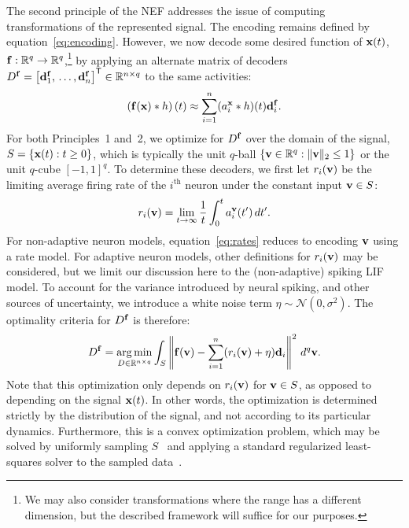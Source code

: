 The second principle of the NEF addresses the issue of computing transformations of the represented signal.
The encoding remains defined by equation~\ref{eq:encoding}.
However, we now decode some desired function of $\mathbf{x}(t)$, $\mathbf{f} : \mathbb{R}^q \rightarrow \mathbb{R}^q$,\footnote{
We may also consider transformations where the range has a different dimension, but the described framework will suffice for our purposes.}
by applying an alternate matrix of decoders $D^{\mathbf{f}} = {\left[ \mathbf{d}^{\mathbf{f}}_1\text{,}\, \ldots\text{,}\, \mathbf{d}^{\mathbf{f}}_n \right]}^\mathsf{T} \in \mathbb{R}^{n \times q}$ to the same activities:
\begin{equation} \label{eq:trans-decode}
\left( \mathbf{f}(\mathbf{x}) \ast h \right)(t) \approx \sum_{i=1}^n (a_i^{\mathbf{x}} \ast h)(t) \mathbf{d}^{\mathbf{f}}_i \text{.}
\end{equation}
For both Principles~1 and~2, we optimize for $D^{\mathbf{f}}$ over the domain of the signal, $S = \{\mathbf{x}(t) : t \ge 0\}$, which is typically the unit $q$-ball $\{ \mathbf{v} \in \mathbb{R}^q : \|\mathbf{v}\|_2 \le 1\}$ or the unit $q$-cube $[-1\text{,}\, 1]^q$.
To determine these decoders, we first let $r_i(\mathbf{v})$ be the limiting average firing rate of the $i^{\text{th}}$ neuron under the constant input $\mathbf{v} \in S$:
\begin{equation} \label{eq:rates}
r_i(\mathbf{v}) = \lim_{t \rightarrow \infty} \frac{1}{t} \int_{0}^t a_i^{\mathbf{v}}(t') \, dt' \text{.}
\end{equation}
For non-adaptive neuron models, equation~\ref{eq:rates} reduces to encoding $\mathbf{v}$ using a rate model.
For adaptive neuron models, other definitions for $r_i(\mathbf{v})$ may be considered, but we limit our discussion here to the (non-adaptive) spiking LIF model.
To account for the variance introduced by neural spiking, and other sources of uncertainty, we introduce a white noise term $\eta \sim \mathcal{N}(0, \sigma^2)$.
The optimality criteria for $D^{\mathbf{f}}$ is therefore:
\begin{equation} \label{eq:decoder_solution}
D^{\mathbf{f}} = \operatorname*{arg\,min}_{D \in \mathbb{R}^{n \times q}} \int_{S} \left\| \mathbf{f}(\mathbf{v}) - \sum_{i=1}^n (r_i(\mathbf{v}) + \eta) \mathbf{d}_i \right\|^2 \, d^q\mathbf{v} \text{.}
\end{equation}
Note that this optimization only depends on $r_i(\mathbf{v})$ for $\mathbf{v} \in S$, as opposed to depending on the signal $\mathbf{x}(t)$.
In other words, the optimization is determined strictly by the distribution of the signal, and not according to its particular dynamics.
Furthermore, this is a convex optimization problem, which may be solved by uniformly sampling $S$~\citep{voelker2017} and applying a standard regularized least-squares solver to the sampled data~\citep{bekolay2013nengo}.
